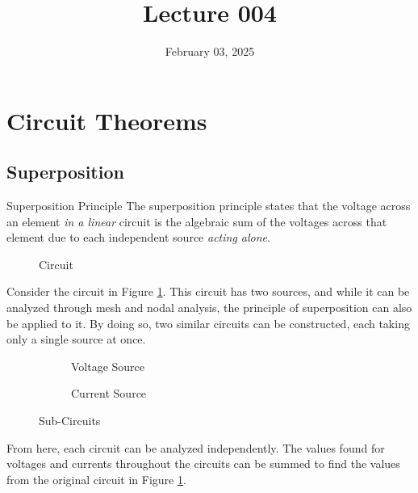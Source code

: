 \documentclass[12pt]{article}
\title{Lecture 004}
\date{February 03, 2025}
\begin{document}
\newpage
\section{Circuit Theorems}
\label{sec:circuitTheorems}

%
%
%
%   
%

\subsection{Superposition}
\label{ssec:superposition}

\begin{definition}{Superposition Principle}
  The superposition principle states that the voltage across an element \textit{in a linear} circuit is the algebraic sum of the voltages across that element due to each independent source \textit{acting alone}.
\end{definition}

\begin{figure}[H]
  \centering
  
  \caption{Circuit}
  \label{fig:011}
\end{figure}
Consider the circuit in Figure \ref{fig:011}. This circuit has two sources, and while it can be analyzed through mesh and nodal analysis, the principle of superposition can also be applied to it. By doing so, two similar circuits can be constructed, each taking only a single source at once.
\begin{figure}[H]
  \centering
  \begin{subfigure}[H]{0.45\textwidth}
    \centering
    
    \caption{Voltage Source}
    \label{fig:012}
  \end{subfigure}
  \begin{subfigure}[H]{0.45\textwidth}
    \centering
    
    \caption{Current Source}
    \label{fig:013}
  \end{subfigure}
  \caption{Sub-Circuits}
  \label{fig:subcircuits}
\end{figure}
From here, each circuit can be analyzed independently. The values found for voltages and currents throughout the circuits can be summed to find the values from the original circuit in Figure \ref{fig:011}.
\end{document}
